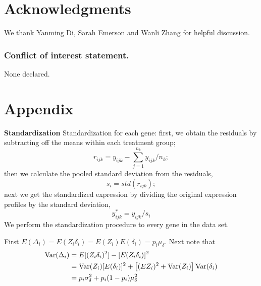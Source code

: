 \documentclass[a4,center,fleqn]{NAR}
\begin{document}
	
	
	
	
	
	\section{Acknowledgments}\label{section:acknowledgment}
	
	We thank Yanming Di, Sarah Emerson and Wanli Zhang for helpful discussion. 
	
	
	\subsubsection{Conflict of interest statement.} None declared.
	
	\newpage
%	
	
	
	
	
	\newpage
	\newpage
	
	\section*{Appendix}\label{section:appendix}
	
	
	\textbf{Standardization} 
	Standardization for each gene: first, we obtain the residuals by subtracting off the means within
	each treatment group;
	\begin{equation}
	r_{ijk} = y_{ijk} - \sum_{j=1}^{n_k}{y}_{ijk}/n_k;
	\end{equation}
	then we calculate the pooled standard deviation from the residuals,
	\begin{equation}
	s_i = \textit{std}(r_{ijk});
	\end{equation}
	next we get the standardized expression by dividing the original expression profiles by the
	standard deviation,
	\begin{equation}
	y^{\ast}_{ijk} = y_{ijk}/s_i
	\end{equation}
	We perform the standardization procedure to every gene in the data set. 
	
	
	First $E(\Delta_i) = E(Z_i\delta_i) = E(Z_i)E(\delta_i) = p_i\mu_{\delta}$. Next note that  
	\begin{equation}\notag
	\begin{aligned}
	\text{Var}(\Delta_i) & = E[(Z_i\delta_i)^2]- [E(Z_i\delta_i)]^2 \\
	& = \text{Var}(Z_i)[E(\delta_i)]^2 + \left[(EZ_i)^2 + \text{Var}(Z_i)\right]\text{Var}(\delta_i) \\
	& =p_i\sigma_{\delta}^2 + p_i(1-p_i)\mu_{\delta}^2
	\end{aligned}
	\end{equation}
	
\end{document}
